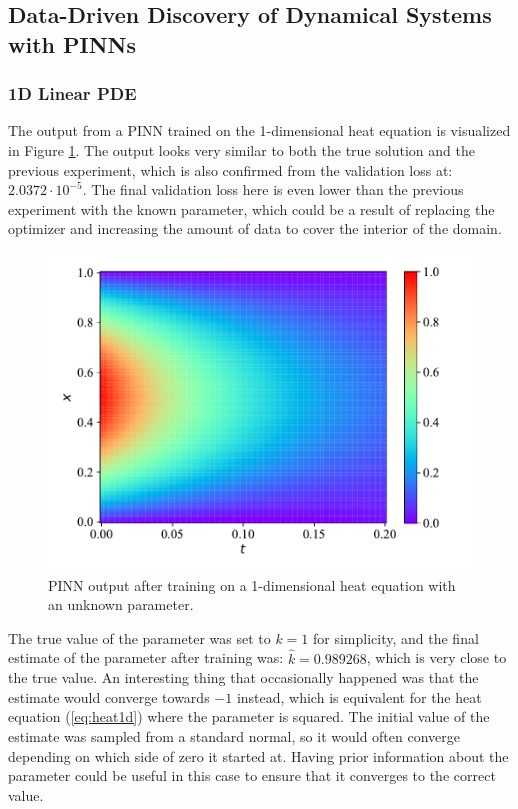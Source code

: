 \subsection{Data-Driven Discovery of Dynamical Systems with PINNs}

\subsubsection{1D Linear PDE}

The output from a PINN trained on the 1-dimensional heat equation is visualized in Figure \ref{fig:heat1d_discovery}. The output looks very similar to both the true solution and the previous experiment, which is also confirmed from the validation loss at: $2.0372 \cdot 10^{-5}$. The final validation loss here is even lower than the previous experiment with the known parameter, which could be a result of replacing the optimizer and increasing the amount of data to cover the interior of the domain.

\begin{figure}[H]
    \centering
    \includegraphics[width=1.0\linewidth]{Figures/InitialExperiments/heat1d_discovery.pdf}
    \caption{PINN output after training on a 1-dimensional heat equation with an unknown parameter.}
    \label{fig:heat1d_discovery}
\end{figure}

The true value of the parameter was set to $k = 1$ for simplicity, and the final estimate of the parameter after training was: $\hat{k} = 0.989268$, which is very close to the true value. An interesting thing that occasionally happened was that the estimate would converge towards $-1$ instead, which is equivalent for the heat equation (\ref{eq:heat1d}) where the parameter is squared. The initial value of the estimate was sampled from a standard normal, so it would often converge depending on which side of zero it started at. Having prior information about the parameter could be useful in this case to ensure that it converges to the correct value.

